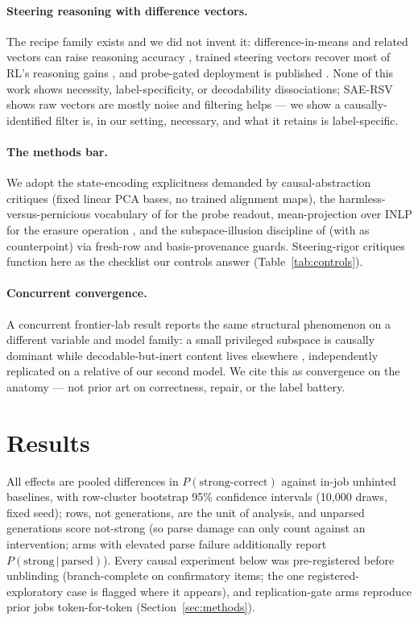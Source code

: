 \documentclass{article} %
\begin{document}
\paragraph{Steering reasoning with difference vectors.} The recipe
family exists and we did not invent it: difference-in-means and related
vectors can raise reasoning accuracy \citep{adaras2026, als2025,
valentino2025}, trained steering vectors recover most of RL's reasoning
gains \citep{steervec2025}, and probe-gated deployment is published
\citep{adaras2026}. None of this work shows necessity,
label-specificity, or decodability dissociations; SAE-RSV
\citep{saersv2025} shows raw vectors are mostly noise and filtering
helps --- we show a causally-identified filter is, in our setting,
necessary, and what it retains is label-specific.

\paragraph{The methods bar.} We adopt the state-encoding explicitness
demanded by causal-abstraction critiques \citep{vacuity2025} (fixed
linear PCA bases, no trained alignment maps), the
harmless-versus-pernicious vocabulary of \citet{nullspace2026} for the
probe readout, mean-projection over INLP for the erasure operation
\citep{erasechoice2025}, and the subspace-illusion discipline of
\citet{makelov2023} (with \citet{wu2024} as counterpoint) via fresh-row
and basis-provenance guards. Steering-rigor critiques
\citep{axbench2025, tan2024, pres2024, ali2025, brumley2024} function
here as the checklist our controls answer (Table~\ref{tab:controls}).

\paragraph{Concurrent convergence.} A concurrent frontier-lab result
reports the same structural phenomenon on a different variable and
model family: a small privileged subspace is causally dominant while
decodable-but-inert content lives elsewhere \citep{workspace2026},
independently replicated on a relative of our second model. We cite
this as convergence on the anatomy --- not prior art on correctness,
repair, or the label battery.

\section{Results}\label{sec:results}

All effects are pooled differences in $P(\text{strong-correct})$ against
in-job unhinted baselines, with row-cluster bootstrap 95\% confidence
intervals (10{,}000 draws, fixed seed); rows, not generations, are the
unit of analysis, and unparsed generations score not-strong (so parse
damage can only count against an intervention; arms with elevated
parse failure additionally report
$P(\text{strong}\,|\,\text{parsed})$). Every causal experiment below
was pre-registered before unblinding (branch-complete on confirmatory
items; the one registered-exploratory case is flagged where it
appears), and replication-gate
arms reproduce prior jobs token-for-token (Section~\ref{sec:methods}).
\end{document}
